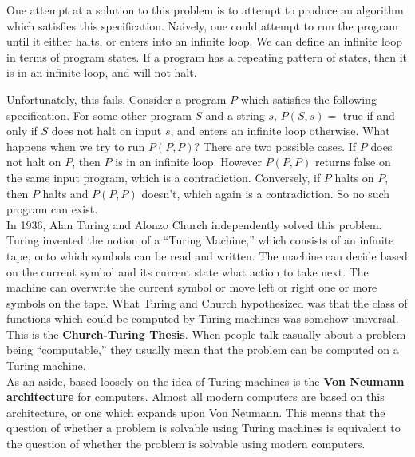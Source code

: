 One attempt at a solution to this problem is to attempt to produce an algorithm which satisfies this specification. Naively, one could attempt to run the program until it either halts, or enters into an infinite loop. We can define an infinite loop in terms of program states. If a program has a repeating pattern of states, then it is in an infinite loop, and will not halt.\\


Unfortunately, this fails. Consider a program $P$ which satisfies the following specification. For some other program $S$ and a string $s$, $P(S,s) =$ true if and only if $S$ does not halt on input $s$, and enters an infinite loop otherwise. What happens when we try to run $P(P,P)$? There are two possible cases. If $P$ does not halt on $P$, then $P$ is in an infinite loop. However $P(P,P)$ returns false on the same input program, which is a contradiction. Conversely, if $P$ halts on $P$, then $P$ halts and $P(P,P)$ doesn't, which again is a contradiction. So no such program can exist.\\

In 1936, Alan Turing and Alonzo Church independently solved this problem. Turing invented the notion of a ``Turing Machine,'' which consists of an infinite tape, onto which symbols can be read and written. The machine can decide based on the current symbol and its current state what action to take next. The machine can overwrite the current symbol or move left or right one or more symbols on the tape. What Turing and Church hypothesized was that the class of functions which could be computed by Turing machines was somehow universal. This is the \textbf{Church-Turing Thesis}. When people talk casually about a problem being ``computable,'' they usually mean that the problem can be computed on a Turing machine.\\

As an aside, based loosely on the idea of Turing machines is the \textbf{Von Neumann architecture} for computers. Almost all modern computers are based on this architecture, or one which expands upon Von Neumann. This means that the question of whether a problem is solvable using Turing machines is equivalent to the question of whether the problem is solvable using modern computers.\\

